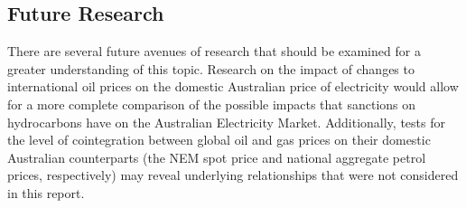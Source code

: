 \subsection{Future Research}
There are several future avenues of research that should be examined for a greater understanding of this
topic. Research on the impact of changes to international oil prices on the domestic Australian price of
electricity would allow for a more complete comparison of the possible impacts that sanctions on
hydrocarbons have on the Australian Electricity Market. Additionally, tests for the level of cointegration
between global oil and gas prices on their domestic Australian counterparts (the NEM spot price and
national aggregate petrol prices, respectively) may reveal underlying relationships that were not considered
in this report.